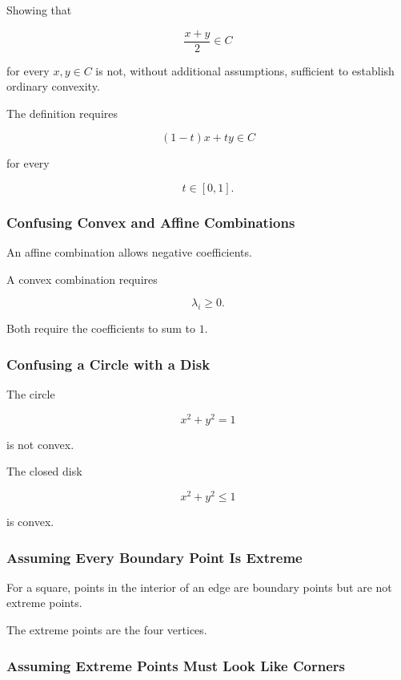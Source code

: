 Showing that

\[
\frac{x+y}{2}\in C
\]

for every \(x,y\in C\) is not, without additional assumptions, sufficient
to establish ordinary convexity.

The definition requires

\[
\boxed{
(1-t)x+ty\in C
}
\]

for every

\[
t\in[0,1].
\]

\subsubsection{Confusing Convex and Affine Combinations}

An affine combination allows negative coefficients.

A convex combination requires

\[
\boxed{
\lambda_i\geq0.
}
\]

Both require the coefficients to sum to \(1\).

\subsubsection{Confusing a Circle with a Disk}

The circle

\[
x^2+y^2=1
\]

is not convex.

The closed disk

\[
x^2+y^2\leq1
\]

is convex.

\subsubsection{Assuming Every Boundary Point Is Extreme}

For a square, points in the interior of an edge are boundary points but are
not extreme points.

The extreme points are the four vertices.

\subsubsection{Assuming Extreme Points Must Look Like Corners}

